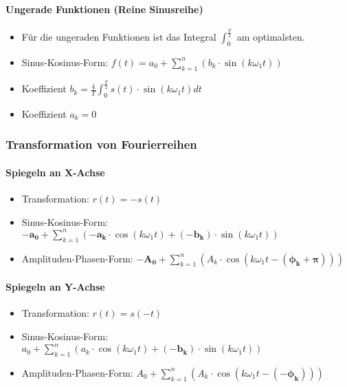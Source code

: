 \paragraph{Ungerade Funktionen (Reine Sinusreihe)}
\begin{itemize}
  \item Für die ungeraden Funktionen ist das Integral
    $\int_0^{\frac{T}{2}}$ am optimalsten.
  \item Sinus-Kosinus-Form: $f(t) = a_0 + \sum_{k=1}^{n}
    (b_k \cdot \sin(k \omega_1 t))$
  \item Koeffizient $b_k = \frac{4}{T} \int_0^{\frac{T}{2}} s(t) \cdot \sin(k \omega_1 t) dt$
  \item Koeffizient $a_k = 0$
\end{itemize}

\subsubsection{Transformation von Fourierreihen}
\paragraph{Spiegeln an X-Achse}
\begin{itemize}
  \item Transformation: $r(t) = -s(t)$
  \item Sinus-Kosinus-Form: $\boldsymbol{-a_0} + \sum_{k=1}^{n}
    (\boldsymbol{-a_k} \cdot \cos(k \omega_1 t) +
    \boldsymbol{(-b_k)} \cdot \sin(k \omega_1 t))$
  \item Amplituden-Phasen-Form: $\boldsymbol{-A_0} + \sum_{k=1}^{n}
    (A_k \cdot \cos(k \omega_1 t  - \boldsymbol{(\phi_k + \pi)}))$
\end{itemize}
\paragraph{Spiegeln an Y-Achse}
\begin{itemize}
  \item Transformation: $r(t) = s(-t)$
  \item Sinus-Kosinus-Form: $a_0 + \sum_{k=1}^{n} ( a_k \cdot
    \cos(k \omega_1 t) + \boldsymbol{(-b_k)} \cdot \sin(k \omega_1 t))$
  \item Amplituden-Phasen-Form: $A_0 + \sum_{k=1}^{n}
    (A_k \cdot \cos(k \omega_1 t  - \boldsymbol{(-\phi_k)}))$
\end{itemize}
